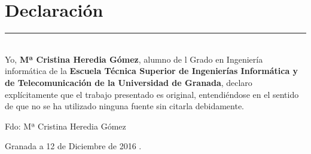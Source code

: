 \chapter*{Declaración}

\noindent\rule[-1ex]{\textwidth}{2pt}\\[4.5ex]

Yo, \textbf{Mª Cristina Heredia Gómez}, alumno de l Grado en Ingeniería informática de la \textbf{Escuela Técnica Superior
de Ingenierías Informática y de Telecomunicación de la Universidad de Granada}, declaro explícitamente que el trabajo presentado es original,
entendiéndose en el sentido de que no se ha utilizado ninguna fuente
sin citarla debidamente.

\vspace{6cm}

\noindent Fdo: Mª Cristina Heredia Gómez

\vspace{2cm}

\begin{flushright}
Granada a 12 de Diciembre de 2016 .
\end{flushright}



